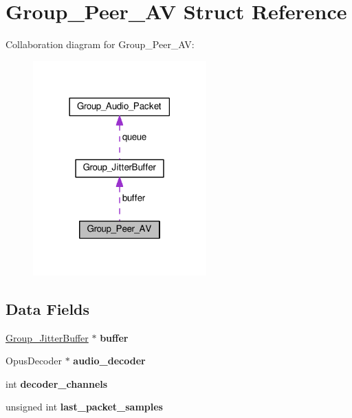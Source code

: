 \hypertarget{struct_group___peer___a_v}{\section{Group\+\_\+\+Peer\+\_\+\+A\+V Struct Reference}
\label{struct_group___peer___a_v}
}


Collaboration diagram for Group\+\_\+\+Peer\+\_\+\+A\+V\+:\nopagebreak
\begin{figure}[H]
\begin{center}
\leavevmode
\includegraphics[width=189pt]{struct_group___peer___a_v__coll__graph}
\end{center}
\end{figure}
\subsection*{Data Fields}
\begin{DoxyCompactItemize}
\item 
\hypertarget{struct_group___peer___a_v_a6552b703c2e3958d1e030416f2893b27}{\hyperlink{struct_group___jitter_buffer}{Group\+\_\+\+Jitter\+Buffer} $\ast$ {\bfseries buffer}}\label{struct_group___peer___a_v_a6552b703c2e3958d1e030416f2893b27}

\item 
\hypertarget{struct_group___peer___a_v_a3b9ee5ac4c354a3e31a8acf7aa1a1b6c}{Opus\+Decoder $\ast$ {\bfseries audio\+\_\+decoder}}\label{struct_group___peer___a_v_a3b9ee5ac4c354a3e31a8acf7aa1a1b6c}

\item 
\hypertarget{struct_group___peer___a_v_afe1ef0788c8c4a05e136d1b00245138e}{int {\bfseries decoder\+\_\+channels}}\label{struct_group___peer___a_v_afe1ef0788c8c4a05e136d1b00245138e}

\item 
\hypertarget{struct_group___peer___a_v_af679faefa170266e24bc2af9b5a0161e}{unsigned int {\bfseries last\+\_\+packet\+\_\+samples}}\label{struct_group___peer___a_v_af679faefa170266e24bc2af9b5a0161e}

\end{DoxyCompactItemize}


